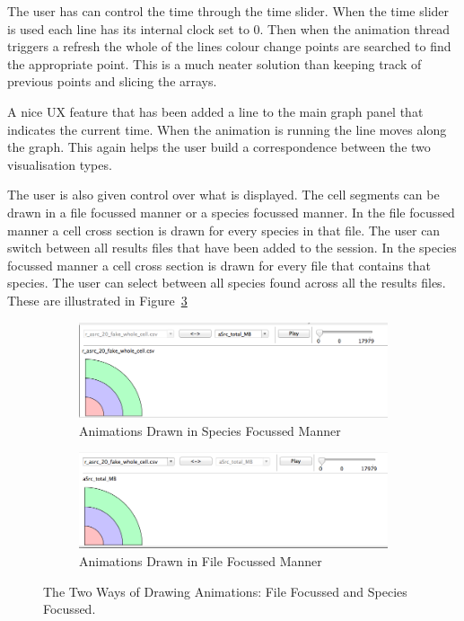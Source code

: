 The user has can control the time through the time slider.  When the time slider is used each line has its internal clock set to 0.  Then when the animation thread triggers a refresh the whole of the lines colour change points are searched to find the appropriate point.  This is a much neater solution than keeping track of previous points and slicing the arrays.

A nice \ac{UX} feature that has been added a line to the main graph panel that indicates the current time.  When the animation is running the line moves along the graph.  This again helps the user build a correspondence between the two visualisation types.

The user is also given control over what is displayed.  The cell segments can be drawn in a file focussed manner or a species focussed manner.  In the file focussed manner a cell cross section is drawn for every species in that file.  The user can switch between all results files that have been added to the session.  In the species focussed manner a cell cross section is drawn for every file that contains that species.  The user can select between all species found across all the results files.  These are illustrated in Figure~\ref{fig:species_file_focussed}

\begin{figure}[h!]
    \centering
    \begin{subfigure}[b]{0.9\textwidth}
        \centering
        \includegraphics[width=\textwidth]{images/species_focussed.png}
        \caption{Animations Drawn in Species Focussed Manner}
        \label{fig:species_focussed}
    \end{subfigure}

    \begin{subfigure}[b]{0.9\textwidth}
        \centering
        \includegraphics[width=\textwidth]{images/file_focussed.png}
        \caption{Animations Drawn in File Focussed Manner}
        \label{fig:file_focussed}
    \end{subfigure}
    \caption{The Two Ways of Drawing Animations:  File Focussed and Species Focussed.}
    \label{fig:species_file_focussed}
\end{figure}


